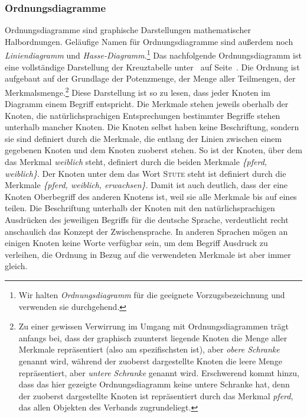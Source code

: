 \documentclass[pagesize,paper=A4,DIV=calc,fontsize=12pt,draft=false]{scrreprt}
\begin{document}
\subsubsection{Ordnungsdiagramme}

Ordnungsdiagramme sind graphische Darstellungen mathematischer Halbordnungen. 
Geläufige Namen für Ordnungsdiagramme sind außerdem noch \emph{Liniendiagramm} und \emph{Hasse-Diagramm}.\footnote{Wir halten \emph{Ordnungsdiagramm} für die geeignete Vorzugsbezeichnung und verwenden sie durchgehend.}
Das nachfolgende Ordnungsdiagramm ist eine vollständige Darstellung der Kreuztabelle unter\emph{~} auf Seite~\pageref{subsec:fba}.
Die Ordnung ist aufgebaut auf der Grundlage der Potenzmenge, der Menge aller Teilmengen, der Merkmalsmenge.\footnote{Zu einer gewissen Verwirrung im Umgang mit Ordnungsdiagrammen trägt anfangs bei, dass der graphisch zuunterst liegende Knoten die Menge aller Merkmale repräsentiert (also am spezifischsten ist), aber \emph{obere Schranke} genannt wird, während der zuoberst dargestellte Knoten die leere Menge repräsentiert, aber \emph{untere Schranke} genannt wird. 
Erschwerend kommt hinzu, dass das hier gezeigte Ordnungsdiagramm keine untere Schranke hat, denn der zuoberst dargestellte Knoten ist repräsentiert durch das Merkmal \emph{pferd}, das allen Objekten des Verbands zugrundeliegt.}
Diese Darstellung ist so zu lesen, dass jeder Knoten im Diagramm einem Begriff entspricht.
Die Merkmale stehen jeweils oberhalb der Knoten, die natürlichsprachigen Entsprechungen bestimmter Begriffe stehen unterhalb mancher Knoten.
Die Knoten selbst haben keine Beschriftung, sondern sie sind definiert durch die Merkmale, die entlang der Linien zwischen einem gegebenen Knoten und dem Knoten zuoberst stehen.
So ist der Knoten, über dem das Merkmal \emph{weiblich} steht, definiert durch die beiden Merkmale \emph{\{pferd, weiblich\}}.
Der Knoten unter dem das Wort \textsc{Stute} steht ist definiert durch die Merkmale \emph{\{pferd, weiblich, erwachsen\}}.
Damit ist auch deutlich, dass der eine Knoten Oberbegriff des anderen Knotens ist, weil sie alle Merkmale bis auf eines teilen.
Die Beschriftung unterhalb der Knoten mit den natürlichsprachigen Ausdrücken des jeweiligen Begriffs für die deutsche Sprache, verdeutlicht recht anschaulich das Konzept der Zwischensprache.
In anderen Sprachen mögen an einigen Knoten keine Worte verfügbar sein, um dem Begriff Ausdruck zu verleihen, die Ordnung in Bezug auf die verwendeten Merkmale ist aber immer gleich.
\end{document}
